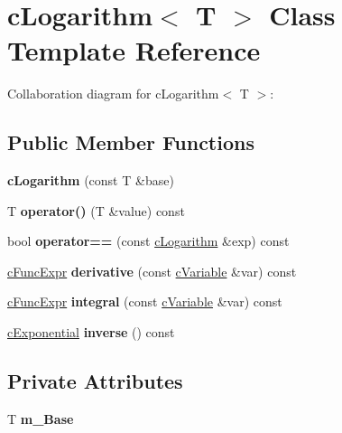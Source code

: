\hypertarget{classcLogarithm}{\section{c\-Logarithm$<$ T $>$ Class Template Reference}
\label{classcLogarithm}
}


Collaboration diagram for c\-Logarithm$<$ T $>$\-:
\subsection*{Public Member Functions}
\begin{DoxyCompactItemize}
\item 
\hypertarget{classcLogarithm_a9d9f82c880eedd380c823b95eb7f7040}{{\bfseries c\-Logarithm} (const T \&base)}\label{classcLogarithm_a9d9f82c880eedd380c823b95eb7f7040}

\item 
\hypertarget{classcLogarithm_af2a1bdb4745f0a88cd75d4aae049bca4}{T {\bfseries operator()} (T \&value) const }\label{classcLogarithm_af2a1bdb4745f0a88cd75d4aae049bca4}

\item 
\hypertarget{classcLogarithm_a6dd3992b0199d3fae419e7aee8014ed1}{bool {\bfseries operator==} (const \hyperlink{classcLogarithm}{c\-Logarithm} \&exp) const }\label{classcLogarithm_a6dd3992b0199d3fae419e7aee8014ed1}

\item 
\hypertarget{classcLogarithm_a0b72d859dda600529370c41150849335}{\hyperlink{classcFuncExpr}{c\-Func\-Expr} {\bfseries derivative} (const \hyperlink{classcVariable}{c\-Variable} \&var) const }\label{classcLogarithm_a0b72d859dda600529370c41150849335}

\item 
\hypertarget{classcLogarithm_afab57a4511496c41b25955180c494424}{\hyperlink{classcFuncExpr}{c\-Func\-Expr} {\bfseries integral} (const \hyperlink{classcVariable}{c\-Variable} \&var) const }\label{classcLogarithm_afab57a4511496c41b25955180c494424}

\item 
\hypertarget{classcLogarithm_a12793e8a98cc892b1dc097491c0cab86}{\hyperlink{classcExponential}{c\-Exponential} {\bfseries inverse} () const }\label{classcLogarithm_a12793e8a98cc892b1dc097491c0cab86}

\end{DoxyCompactItemize}
\subsection*{Private Attributes}
\begin{DoxyCompactItemize}
\item 
\hypertarget{classcLogarithm_a1f47c4908f14d679d5498d5ff09565c9}{T {\bfseries m\-\_\-\-Base}}\label{classcLogarithm_a1f47c4908f14d679d5498d5ff09565c9}

\end{DoxyCompactItemize}
